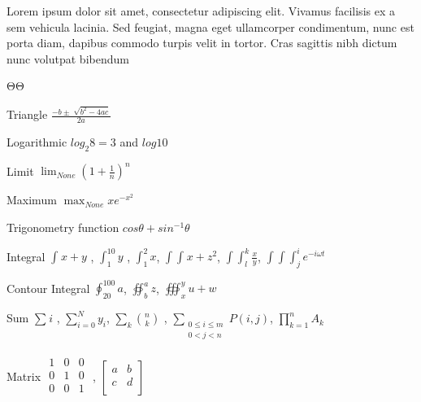\documentclass{book}
\begin{document}
Lorem ipsum dolor sit amet, consectetur adipiscing elit. Vivamus facilisis ex a sem vehicula lacinia. Sed feugiat, magna eget ullamcorper condimentum, nunc est porta diam, dapibus commodo turpis velit in tortor. Cras sagittis nibh dictum nunc volutpat bibendum 

ΘΘ

Triangle $\frac{-b\pm \sqrt[]{{b}^{2}-4ac}}{2a}$

Logarithmic ${log}_{2}8=3$ and $log10$

Limit $\lim_{None}{(1+\frac{1}{n})}^{n}$

Maximum $\max_{None}x{e}^{-{x}^{2}}$

Trigonometry function $cos\theta + {sin}^{-1}\theta $

Integral $\int_{}^{} x+y$ , $\int_{1}^{10} y$ , $\int_{1}^{2} x$, $\int\!\int _{}^{} x+{z}^{2}$, $\int\!\int _{l}^{k} \frac{x}{y}$, $\int\!\int\!\int _{j}^{i} {e}^{-i\omega t}$

Contour Integral $\oint _{20}^{100} a$, $\oiint _{b}^{a} z$, $\oiiint _{x}^{y} u+w$

Sum $\sum _{}^{} i$ , $\sum _{i=0}^{N} {y}_{i}$, $\sum _{k}^{} {n \choose k}$ , $\sum _{\begin{array}{lr}
0\leq  i ≤ m \\
0<j<n  \\
\end{array}}^{} P(i,j)$, $\prod _{k=1}^{n} {A}_{k}$

Matrix $\begin{matrix}
 1 & 0 & 0 \\
0 & 1 & 0 \\
0 & 0 & 1 \\
 \end{matrix}
$ , $\begin{bmatrix}
 a & b \\
c & d \\
 \end{bmatrix}
$
\end{document}
